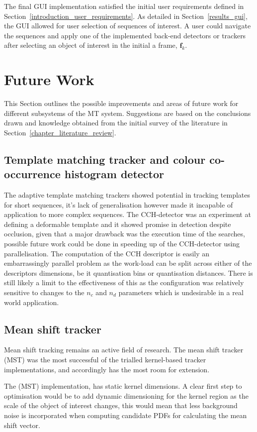 The final GUI implementation satisfied the initial user requirements defined in
Section~\ref{introduction_user_requirements}. As detailed in
Section~\ref{results_gui}, the GUI allowed for user selection of sequences of
interest. A user could navigate the sequences and apply one of the implemented
back-end detectors or trackers after selecting an object of interest in the
initial a frame, $\mathbf{f}_k$.


\section{Future Work}\label{future}
This Section outlines the possible improvements and areas
of future work for different subsystems of the MT system. Suggestions are based
on the conclusions drawn and knowledge obtained from the initial survey of the
literature in Section~\ref{chapter_literature_review}.

\subsection{Template matching tracker and colour co-occurrence histogram
detector}
The adaptive template matching trackers showed potential in tracking templates for
short sequences, it's lack of generalisation however made it incapable of
application to more complex sequences. 
The CCH-detector was an experiment at defining a deformable template
and it showed promise in detection despite occlusion, given that a major
drawback was the execution time of the searches, possible future work could be
done in speeding up of the CCH-detector using parallelisation. The computation
of the CCH descriptor is easily an embarrassingly parallel problem as the
work-load can be split across either of the descriptors dimensions, be it
quantisation bins or quantisation distances. 
There is still likely a limit to the effectiveness of this as the configuration
was relatively sensitive to changes to the $n_c$ and $n_d$ parameters which is
undesirable in a real world application.

\subsection{Mean shift tracker}
Mean shift tracking remains an active field of research. The mean shift tracker
(MST) was the most successful of the trialled kernel-based tracker implementations, and
accordingly has the most room for extension.

The (MST) implementation, has static kernel dimensions. A clear first
step to optimisation would be to add dynamic dimensioning for the kernel region
as the scale of the object of interest changes, this would mean that less
background noise is incorporated when computing candidate PDFs for calculating
the mean shift vector.

